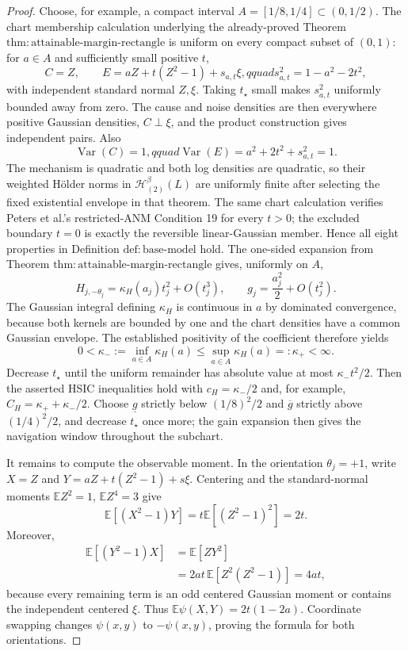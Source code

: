 \documentclass{article}
\begin{document}
\begin{proof}
Choose, for example, a compact interval \(A=[1/8,1/4]\subset(0,1/2)\).  The chart membership calculation underlying the already-proved Theorem \(\mathrm{thm:attainable\text{-}margin\text{-}rectangle}\) is uniform on every compact subset of \((0,1)\): for \(a\in A\) and sufficiently small positive \(t\),
\[
C=Z,\qquad E=aZ+t(Z^2-1)+s_{a,t}\xi,qquad
s_{a,t}^2=1-a^2-2t^2,
\]
with independent standard normal \(Z,\xi\).  Taking \(t_\star\) small makes \(s_{a,t}^2\) uniformly bounded away from zero.  The cause and noise densities are then everywhere positive Gaussian densities, \(C\perp\xi\), and the product construction gives independent pairs.  Also
\[
\operatorname{Var}(C)=1,qquad
\operatorname{Var}(E)=a^2+2t^2+s_{a,t}^2=1.
\]
The mechanism is quadratic and both log densities are quadratic, so their weighted H\"older norms in \(\mathcal H_{(2)}^\beta(L)\) are uniformly finite after selecting the fixed existential envelope in that theorem.  The same chart calculation verifies Peters et al.'s restricted-ANM Condition 19 for every \(t>0\); the excluded boundary \(t=0\) is exactly the reversible linear-Gaussian member.  Hence all eight properties in Definition \(\mathrm{def:base\text{-}model}\) hold.  The one-sided expansion from Theorem \(\mathrm{thm:attainable\text{-}margin\text{-}rectangle}\) gives, uniformly on \(A\),
\[
H_{j,-\theta_j}=\kappa_H(a_j)t_j^2+O(t_j^3),
\qquad
g_j=\frac{a_j^2}{2}+O(t_j^2).
\]
The Gaussian integral defining \(\kappa_H\) is continuous in \(a\) by dominated convergence, because both kernels are bounded by one and the chart densities have a common Gaussian envelope.  The established positivity of the coefficient therefore yields
\[
0<\kappa_-:=\inf_{a\in A}\kappa_H(a)
\le \sup_{a\in A}\kappa_H(a)=:\kappa_+<\infty.
\]
Decrease \(t_\star\) until the uniform remainder has absolute value at most \(\kappa_-t^2/2\).  Then the asserted HSIC inequalities hold with \(c_H=\kappa_-/2\) and, for example, \(C_H=\kappa_++\kappa_-/2\).  Choose \(\underline g\) strictly below \((1/8)^2/2\) and \(\overline g\) strictly above \((1/4)^2/2\), and decrease \(t_\star\) once more; the gain expansion then gives the navigation window throughout the subchart.

It remains to compute the observable moment.  In the orientation \(\theta_j=+1\), write \(X=Z\) and \(Y=aZ+t(Z^2-1)+s\xi\).  Centering and the standard-normal moments \(\mathbb EZ^2=1\), \(\mathbb EZ^4=3\) give
\[
\mathbb E[(X^2-1)Y]
=t\mathbb E[(Z^2-1)^2]=2t.
\]
Moreover,
\[
\begin{aligned}
\mathbb E[(Y^2-1)X]
&=\mathbb E[ZY^2]\\
&=2at\,\mathbb E[Z^2(Z^2-1)]
=4at,
\end{aligned}
\]
because every remaining term is an odd centered Gaussian moment or contains the independent centered \(\xi\).  Thus \(\mathbb E\psi(X,Y)=2t(1-2a)\).  Coordinate swapping changes \(\psi(x,y)\) to \(-\psi(x,y)\), proving the formula for both orientations.


\end{proof}
\end{document}
